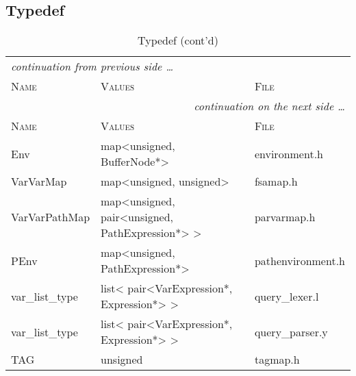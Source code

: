 \clearpage

\subsection{Typedef}
\begin{tiny}
\begin{longtable}[ht]{|p{0.2\tablwidth}|p{0.4\tablwidth}|p{0.3\tablwidth}|}
  \caption[Typedef]{Typedef}
  \label{table_(defines_enums_typedef):typedef} \\
  \hline
  \endfirsthead
  \caption[Typedef (cont'd)]{Typedef (cont'd)} \\
  \hline
  \multicolumn{3}{l}{\textsl{continuation from previous side \ldots}} \\
  \hline \cellcolor{tablefirstrowcolor} \textsc{Name} & \cellcolor{tablefirstrowcolor} \textsc{Values} & \cellcolor{tablefirstrowcolor} \textsc{File} \\
  \hline
  \endhead
  \hline
  \multicolumn{3}{r}{\textsl{continuation on the next side \ldots}} \\
  \hline
  \endfoot
  \hline
  \endlastfoot

  \hline \cellcolor{tablefirstrowcolor} \textsc{Name} & \cellcolor{tablefirstrowcolor} \textsc{Values} & \cellcolor{tablefirstrowcolor} \textsc{File} \\
  \hline Env & map<unsigned, BufferNode*> & environment.h \\
  \hline VarVarMap & map<unsigned, unsigned> & fsamap.h \\
  \hline VarVarPathMap & map<unsigned, pair<unsigned, PathExpression*> > & parvarmap.h \\
  \hline PEnv & map<unsigned, PathExpression*> & pathenvironment.h \\
  \hline var\_list\_type & list< pair<VarExpression*, Expression*> > & query\_lexer.l \\
  \hline var\_list\_type & list< pair<VarExpression*, Expression*> > & query\_parser.y \\
  \hline TAG & unsigned & tagmap.h \\
  \hline
\end{longtable}
\end{tiny} 